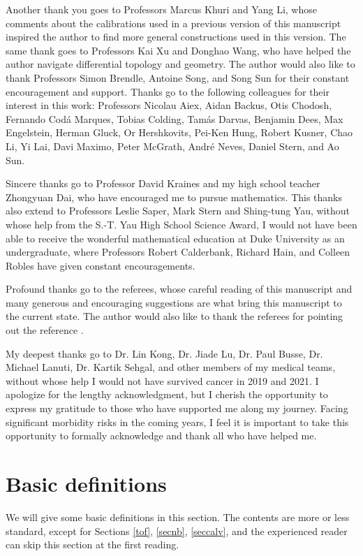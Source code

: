\documentclass[11pt,a4paper]{amsart}
\numberwithin{equation}{section}
\theoremstyle{plain}
\theoremstyle{definition}
\numberwithin{equation}{subsection}
\begin{document}
Another thank you goes to Professors Marcus Khuri and Yang Li, whose comments about the calibrations used in a previous version of this manuscript inspired the author to find more general constructions used in this version. The same thank goes to Professors Kai Xu and Donghao Wang, who have helped the author navigate differential topology and geometry. The author would also like to thank Professors Simon Brendle, Antoine Song, and Song Sun for their constant encouragement and support.  Thanks go to the following colleagues for their interest in this work: Professors
	Nicolau Aiex, 
	Aidan Backus, Otis Chodosh, Fernando Cod\'{a} Marques, 
	Tobias Colding,
	 Tam\'{a}s Darvas, Benjamin Dees, Max Engelstein,  Herman Gluck, Or Hershkovits, Pei-Ken Hung, Robert Kusner, Chao Li, Yi Lai, 
Davi Maximo,	Peter McGrath,  Andr\'{e} Neves, Daniel Stern, and Ao Sun.

 Sincere thanks go to Professor David Kraines and my high school teacher Zhongyuan Dai, who have encouraged me to pursue mathematics. This thanks also extend to Professors Leslie Saper, Mark Stern and Shing-tung Yau, without whose help from the S.-T. Yau High School Science Award, I would not have been able to receive the wonderful mathematical education at Duke University as an undergraduate, where Professors Robert Calderbank,
  Richard Hain, and Colleen Robles have given constant encouragements.
  
	
Profound thanks go to the referees, whose careful reading of this manuscript and many generous and encouraging suggestions are what bring this manuscript to the current state. The author would also like to thank the referees for pointing out the reference \cite{MR1305283}.

My deepest thanks go to Dr. Lin Kong, Dr. Jiade Lu,  Dr. Paul Busse,  Dr. Michael Lanuti, Dr. Kartik Sehgal, and other members of my medical teams, without whose help I would not have survived cancer in 2019 and 2021. I apologize for the lengthy acknowledgment, but I cherish the opportunity to express my gratitude to those who have supported me along my journey. Facing significant morbidity risks in the coming years, I feel it is important to take this opportunity to formally acknowledge and thank all who have helped me.
	\section{Basic definitions}\label{bsdefn}
	We will give some basic definitions in this section. The contents are more or less standard, except for Sections \ref{tof}, \ref{secnb}, \ref{seccalv}, and the experienced reader can skip this section at the first reading.
\end{document}
